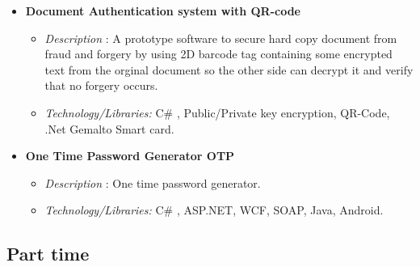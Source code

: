 \documentclass[11pt,a4paper]{moderncv}
\begin{document}
{\begin{itemize}
\begin{itemize}
\item  \textsl{Technology/Libraries:} C++, Qt, Win32 API, PHP, MySQL.
\item  \textsl{Project size/Time:} 3 month project,  +5K Line of Code.
\end{itemize}
\item \textbf{Document Authentication system with QR-code}
\begin{itemize}
\item  \textsl{Description} : A prototype software to secure hard copy document from fraud and forgery by using 2D barcode tag containing some encrypted text from the orginal document so the other side can decrypt it and verify that no forgery occurs.
\item  \textsl{Technology/Libraries:} C\# , Public/Private key encryption, QR-Code, .Net Gemalto Smart card.
\end{itemize}
\item \textbf{One Time Password Generator OTP}
\begin{itemize}
\item  \textsl{Description} : One time password generator.
\item  \textsl{Technology/Libraries:} C\# , ASP.NET, WCF, SOAP, Java, Android. 
\end{itemize}
\end{itemize}}



\pagebreak

\subsection{Part time}


\end{document}
